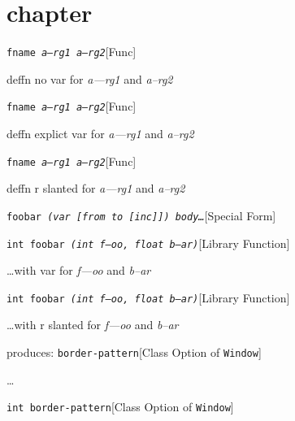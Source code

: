 \documentclass{book}
\begin{document}
\label{anchor:Top}%
\chapter{chapter}
\label{anchor:chapter}%

\noindent\texttt{fname \bgroup{}\normalfont{}\textsl{a---rg1 a--rg2}\egroup{}}\hfill[Func]



%
deffn no var for \textsl{a---rg1} and \textsl{a--rg2}

\noindent\texttt{fname \bgroup{}\normalfont{}\textsl{\textsl{a---rg1} \textsl{a--rg2}}\egroup{}}\hfill[Func]



%
deffn explict var for \textsl{a---rg1} and \textsl{a--rg2}

\noindent\texttt{fname \bgroup{}\normalfont{}\textsl{\textnormal{\textsl{a---rg1}} \textnormal{\textsl{a--rg2}}}\egroup{}}\hfill[Func]



%
deffn r slanted for \textsl{a---rg1} and \textsl{a--rg2}

\noindent\texttt{foobar \bgroup{}\normalfont{}\textsl{(var {[}from to {[}inc{]}{]}) body\dots{}\@}\egroup{}}\hfill[Special Form]



%

\noindent\texttt{int foobar \bgroup{}\normalfont{}\textsl{(int \textsl{f---oo}, float \textsl{b--ar})}\egroup{}}\hfill[Library Function]



%
\dots{}\@ with var for \textsl{f---oo} and \textsl{b--ar}

\noindent\texttt{int foobar \bgroup{}\normalfont{}\textsl{(int \textnormal{\textsl{f---oo}}, float \textnormal{\textsl{b--ar}})}\egroup{}}\hfill[Library Function]



%
\dots{}\@ with r slanted for \textsl{f---oo} and \textsl{b--ar}

\noindent{}produces:
\noindent\texttt{border-pattern}\hfill[Class Option of \texttt{Window}]



%
\dots{}\@

\noindent\texttt{\texttt{int} border-pattern}\hfill[Class Option of \texttt{Window}]
\end{document}
